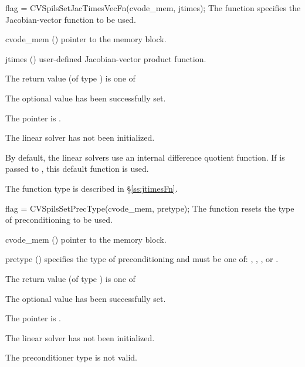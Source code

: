 {
  flag = CVSpilsSetJacTimesVecFn(cvode\_mem, jtimes);
}
{
  The function  specifies the Jacobian-vector 
  function to be used.
}
{
  \begin{args}
  \item[cvode\_mem] ()
    pointer to the {\cvodes} memory block.
  \item[jtimes] ()
    user-defined Jacobian-vector product function.
  \end{args}
}
{
  The return value  (of type ) is one of
  \begin{args}
  \item[\Id{CVSPILS\_SUCCESS}] 
    The optional value has been successfully set.
  \item[\Id{CVSPILS\_MEM\_NULL}]
    The  pointer is .
  \item[\Id{CVSPILS\_LMEM\_NULL}]
    The {\cvspils} linear solver has not been initialized.
  \end{args}
}
{
  By default, the {\cvspils} linear solvers use an internal difference quotient function.
  If  is passed to , this default function is used.

  The function type  is described in \S\ref{ss:jtimesFn}.
}
{
  flag = CVSpilsSetPrecType(cvode\_mem, pretype);
}
{
  The function  resets the type
  of preconditioning to be used.
}
{
  \begin{args}
  \item[cvode\_mem] ()
    pointer to the {\cvodes} memory block.
  \item[pretype] ()
    specifies the type of preconditioning and must be one of:
    , , , or .
  \end{args}
}
{
  The return value  (of type ) is one of
  \begin{args}
  \item[\Id{CVSPILS\_SUCCESS}] 
    The optional value has been successfully set.
  \item[\Id{CVSPILS\_MEM\_NULL}]
    The  pointer is .
  \item[\Id{CVSPILS\_LMEM\_NULL}]
    The {\cvspils} linear solver has not been initialized.
  \item[\Id{CVSPILS\_ILL\_INPUT}]
    The preconditioner type  is not valid.
  \end{args}
}
